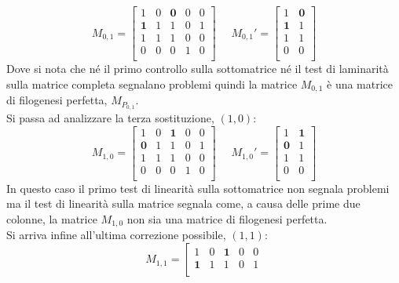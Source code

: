 \documentclass[a4paper,12pt, oneside]{book}
\begin{document}
\begin{esempio}
  \[
    M_{0,1}=\left[
      \begin{matrix}
        1 & 0 & \mathbf{0} & 0 & 0\\
        \mathbf{1} & 1 & 1 & 0 & 1\\
        1 & 1 & 1 & 0 & 0\\
        0 & 0 & 0 & 1 & 0\\
      \end{matrix}
    \right]\,\,\,\,\,\,\,\,
    M_{0,1}'=\left[
      \begin{matrix}
        1 & \mathbf{0} \\
        \mathbf{1} & 1\\
        1 & 1 \\
        0 & 0 \\
      \end{matrix}
    \right]
  \]
  Dove si nota che né il primo controllo sulla sottomatrice né il test di
  laminarità sulla matrice 
  completa segnalano problemi quindi la matrice $M_{0,1}$ è una matrice di
  filogenesi perfetta, $M_{P_{0,1}}$.\\
  Si passa ad analizzare la terza sostituzione, $(1,0)$:
  \[
    M_{1,0}=\left[
      \begin{matrix}
        1 & 0 & \mathbf{1} & 0 & 0\\
        \mathbf{0} & 1 & 1 & 0 & 1\\
        1 & 1 & 1 & 0 & 0\\
        0 & 0 & 0 & 1 & 0\\
      \end{matrix}
    \right]\,\,\,\,\,\,\,\,
    M_{1,0}'=\left[
      \begin{matrix}
        1 & \mathbf{1} \\
        \mathbf{0} & 1\\
        1 & 1 \\
        0 & 0 \\
      \end{matrix}
    \right]
  \]
  In questo caso il primo test di linearità sulla sottomatrice non segnala
  problemi ma il test di linearità sulla matrice segnala come, a causa delle
  prime due colonne, la matrice $M_{1,0}$ non sia una matrice di filogenesi
  perfetta. \\
  Si arriva infine all'ultima correzione possibile, $(1,1)$:
  \[
    M_{1,1}=\left[
      \begin{matrix}
        1 & 0 & \mathbf{1} & 0 & 0\\
        \mathbf{1} & 1 & 1 & 0 & 1\\

\end{matrix}\]
\end{esempio}
\end{document}
